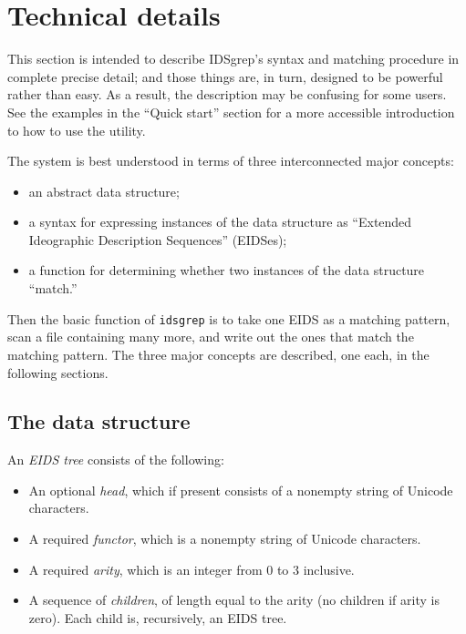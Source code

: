 \documentclass[twocolumn]{report}
\begin{document}

\chapter{Technical details}

\noindent

This section is intended to describe IDSgrep's syntax and matching procedure
in complete precise detail; and those things are, in turn, designed to be
powerful rather than easy.  As a result, the description may be confusing
for some users.  See the examples in the ``Quick start'' section for a more
accessible introduction to how to use the utility.

The system is best understood in terms of three interconnected major
concepts:
\begin{itemize}
  \item an abstract data structure;
  \item a syntax for expressing instances of the data structure as
    ``Extended Ideographic Description Sequences'' (EIDSes);
  \item a function for determining whether two instances of the data
    structure ``match.''
\end{itemize}

Then the basic function of \texttt{idsgrep} is to take one EIDS as a
matching pattern, scan a file containing many more, and write out the ones
that match the matching pattern.  The three major concepts are described,
one each, in the following sections.


\section{The data structure}

An \emph{EIDS tree} consists of the following:

\begin{itemize}
  \item An optional \emph{head}, which if present consists of a nonempty
    string of Unicode characters.
  \item A required \emph{functor}, which is a nonempty string of Unicode
    characters.
  \item A required \emph{arity}, which is an integer from 0 to 3 inclusive.
  \item A sequence of \emph{children}, of length equal to the arity (no
    children if arity is zero).  Each child is, recursively, an EIDS tree.
\end{itemize}
\end{document}

